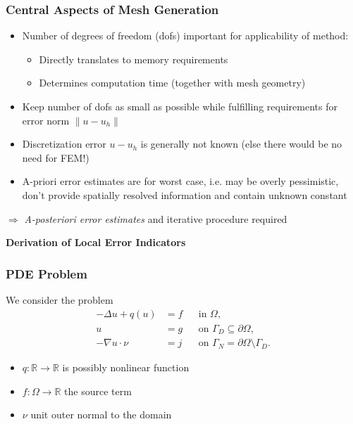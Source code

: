 \documentclass[aspectratio=169,11pt]{beamer}
\theoremstyle{definition}
\begin{document}
\begin{frame}
\frametitle{Central Aspects of Mesh Generation}
\begin{itemize}
  \item Number of degrees of freedom (dofs) important for applicability of method:
    \begin{itemize}
      \item Directly translates to memory requirements
      \item Determines computation time (together with mesh geometry)
    \end{itemize}
  \item Keep number of dofs as small as possible while fulfilling requirements for
    error norm $\| u - u_h \|$
  \item Discretization error $u - u_h$ is generally not known (else there would be
    no need for FEM!)
  \item A-priori error estimates are for worst case, i.e. may be overly pessimistic,
    don't provide spatially resolved information and contain unknown constant
\end{itemize}
$\Rightarrow$ \emph{A-posteriori error estimates} and iterative procedure required
\end{frame}

\begin{frame}
\begin{center}
\Large\textbf{Derivation of Local Error Indicators}
\end{center}
\end{frame}


\begin{frame}
\frametitle{PDE Problem}
We consider the problem
\begin{subequations} \label{eq:ProblemStrong}
\begin{align*}
-\Delta u + q(u) &= f &&\text{in $\Omega$},\\
u &= g &&\text{on $\Gamma_D\subseteq\partial\Omega$},\\
-\nabla u\cdot \nu &= j &&\text{on $\Gamma_N=\partial\Omega\setminus\Gamma_D$}.
\end{align*}
\end{subequations}
\begin{itemize}
\item $q:\mathbb{R}\to\mathbb{R}$ is possibly
nonlinear function
\item $f: \Omega\to\mathbb{R}$ the source term
\item $\nu$ unit outer normal to the domain
\end{itemize}
\end{frame}
\end{document}
